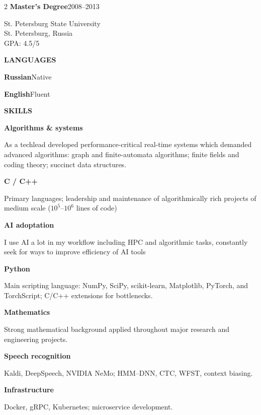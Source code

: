 \documentclass[10pt,a4paper]{article}
\newcommand{\cvsection}[1]{%
  \vspace{2.1mm}%
  {\color{accent}\bfseries\fontsize{10.5}{11.5}\selectfont\MakeUppercase{#1}}\par
  \vspace{0.7mm}{\color{rule}\hrule height 0.55pt}\vspace{1.5mm}%
}
\newcommand{\sideentry}[3]{%
  \textbf{#2}\hfill{\color{muted}\small #1}\par
  {\color{muted}#3}\par
}
\newcommand{\skillgroup}[2]{%
  \textbf{#1}\par
  {\color{muted}#2}\par\vspace{1.4mm}%
}
\begin{document}
\begin{paracol}{2}
\sideentry{2008--2013}{Master's Degree}{St. Petersburg State University\\St. Petersburg, Russia\\GPA: 4.5/5}

\cvsection{Languages}

\textbf{Russian}\hfill Native\par
\vspace{0.8mm}
\textbf{English}\hfill Fluent\par

\cvsection{Skills}

\skillgroup{Algorithms \& systems}{As a techlead developed performance-critical real-time systems which demanded advanced algorithms: graph and finite-automata algorithms; finite fields and coding theory; succinct data structures.}

\skillgroup{C / C++}{Primary languages; leadership and maintenance of algorithmically rich projects of medium scale ($10^5$--$10^6$ lines of code)}

\skillgroup{AI adoptation}{I use AI a lot in my workflow including HPC and algorithmic tasks, constantly seek for ways to improve efficiency of AI tools}

\skillgroup{Python}{Main scripting language: NumPy, SciPy, scikit-learn, Matplotlib, PyTorch, and TorchScript; C/C++ extensions for bottlenecks.}

\skillgroup{Mathematics}{Strong mathematical background applied throughout major research and engineering projects.}

\skillgroup{Speech recognition}{Kaldi, DeepSpeech, NVIDIA NeMo; HMM--DNN, CTC, WFST, context biasing.}

\skillgroup{Infrastructure}{Docker, gRPC, Kubernetes; microservice development.}

\end{paracol}
\end{document}
